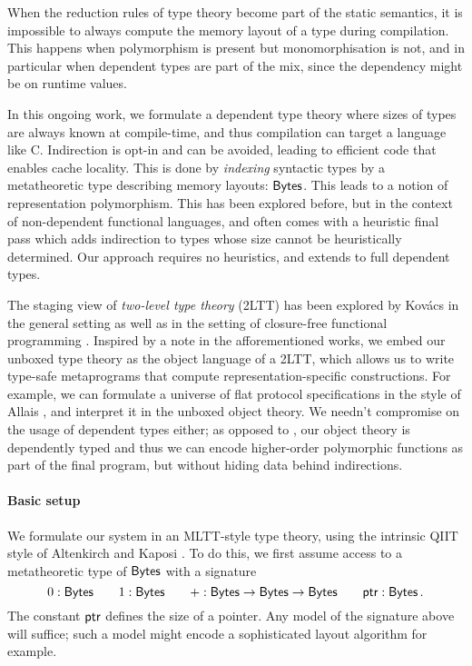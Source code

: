 When the reduction rules of type theory become part of the static semantics, it
is impossible to always compute the memory layout of a type during compilation.
This happens when polymorphism is present but monomorphisation is not, and in
particular when dependent types are part of the mix, since the dependency might
be on runtime values.

In this ongoing work, we formulate a dependent type theory where sizes of types
are always known at compile-time, and thus compilation can target a language
like C. Indirection is opt-in and can be avoided, leading to efficient code that
enables cache locality. This is done by \emph{indexing} syntactic types by a
metatheoretic type describing memory layouts: $\textsf{Bytes}$. This leads to a notion
of representation polymorphism. This has been explored before, but in the
context of non-dependent functional languages, and often comes with a heuristic
final pass which adds indirection to types whose size cannot be heuristically
determined. Our approach requires no heuristics, and extends to full dependent
types.

The staging view of \emph{two-level type theory} (2LTT) \cite{Annenkov2023-vk}
has been explored by Kov\'acs in the general setting \cite{Kovacs2022-rf} as
well as in the setting of closure-free functional programming
\cite{Kovacs2024-hn}. Inspired by a note in the afforementioned works, we embed
our unboxed type theory as the object language of a 2LTT, which allows us to
write type-safe metaprograms that compute representation-specific constructions.
For example, we can formulate a universe of flat protocol specifications in the
style of Allais \cite{Allais2023-zq}, and interpret it in the unboxed object
theory. We needn't compromise on the usage of dependent types either; as opposed
to \cite{Kovacs2024-hn}, our object theory is dependently typed and thus we can
encode higher-order polymorphic functions as part of the final program, but
without hiding data behind indirections.

\paragraph{Basic setup}
We formulate our system in an MLTT-style type theory, using the intrinsic QIIT
style of Altenkirch and Kaposi \cite{Altenkirch2016-zc}.
To do this, we first assume access to a metatheoretic type of
\(\textsf{Bytes}\) with a signature
\[
0 : \textsf{Bytes} \qquad 1 : \textsf{Bytes} \qquad + : \textsf{Bytes} \to \textsf{Bytes} \to \textsf{Bytes} \qquad \textsf{ptr} : \textsf{Bytes} \,.
\]
The constant \(\textsf{ptr}\) defines the size of a pointer. Any model of
the signature above will suffice; such a model might encode a sophisticated
layout algorithm for example.

